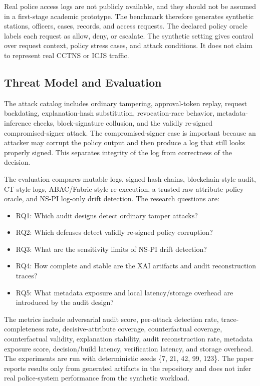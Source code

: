 Real police access logs are not publicly available, and they should not be
assumed in a first-stage academic prototype. The benchmark therefore generates
synthetic stations, officers, cases, records, and access requests. The declared
policy oracle labels each request as allow, deny, or escalate. The synthetic
setting gives control over request context, policy stress cases, and attack
conditions. It does not claim to represent real CCTNS or ICJS traffic.

\subsection{Threat Model and Evaluation}

The attack catalog includes ordinary tampering, approval-token replay, request
backdating, explanation-hash substitution, revocation-race behavior,
metadata-inference checks, block-signature collusion, and the validly re-signed
compromised-signer attack. The compromised-signer case is important because an
attacker may corrupt the policy output and then produce a log that still looks
properly signed. This separates integrity of the log from correctness of the
decision.

The evaluation compares mutable logs, signed hash chains, blockchain-style
audit, CT-style logs, ABAC/Fabric-style re-execution, a trusted raw-attribute
policy oracle, and NS-PI log-only drift detection. The research questions are:

\begin{itemize}
    \item RQ1: Which audit designs detect ordinary tamper attacks?
    \item RQ2: Which defenses detect validly re-signed policy corruption?
    \item RQ3: What are the sensitivity limits of NS-PI drift detection?
    \item RQ4: How complete and stable are the XAI artifacts and audit
    reconstruction traces?
    \item RQ5: What metadata exposure and local latency/storage overhead are
    introduced by the audit design?
\end{itemize}

The metrics include adversarial audit score, per-attack detection rate,
trace-completeness rate, decisive-attribute coverage, counterfactual coverage,
counterfactual validity, explanation stability, audit reconstruction rate,
metadata exposure score, decision/build latency, verification latency, and
storage overhead. The experiments are run with deterministic seeds
\{7, 21, 42, 99, 123\}. The paper reports results only from generated
artifacts in the repository and does not infer real police-system performance
from the synthetic workload.
